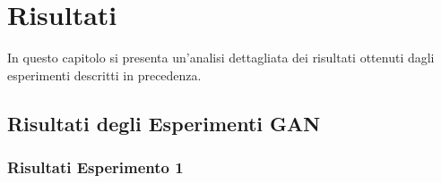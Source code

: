 \chapter{Risultati}
\label{cap:risultati}

In questo capitolo si presenta un'analisi dettagliata dei risultati ottenuti dagli esperimenti descritti in precedenza.

\section{Risultati degli Esperimenti GAN}
\subsection{Risultati Esperimento 1}
~\\

